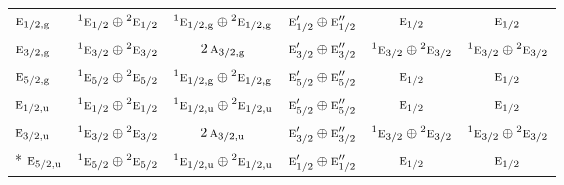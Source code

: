 \documentclass[10pt,a4paper]{article}
\numberwithin{equation}{section}
\newcommand{\irr}[1]{\text{\normalfont\scshape #1}}
\newcommand{\conjpair}[1]{{}^{#1}}
\newcommand{\ptag}[1]{\mathrm{#1}}
\begin{document}
{\begin{longtable}{@{}lccccc@{}}
$\irr{e}_{1/2,\ptag{g}}$ & $\conjpair{1}\irr{e}_{1/2}\oplus \conjpair{2}\irr{e}_{1/2}$ & $\conjpair{1}\irr{e}_{1/2,\ptag{g}}\oplus \conjpair{2}\irr{e}_{1/2,\ptag{g}}$ & $\irr{e}_{1/2}'\oplus \irr{e}_{1/2}''$ & $\irr{e}_{1/2}$ & $\irr{e}_{1/2}$\\
$\irr{e}_{3/2,\ptag{g}}$ & $\conjpair{1}\irr{e}_{3/2}\oplus \conjpair{2}\irr{e}_{3/2}$ & $2\,\irr{a}_{3/2,\ptag{g}}$ & $\irr{e}_{3/2}'\oplus \irr{e}_{3/2}''$ & $\conjpair{1}\irr{e}_{3/2}\oplus \conjpair{2}\irr{e}_{3/2}$ & $\conjpair{1}\irr{e}_{3/2}\oplus \conjpair{2}\irr{e}_{3/2}$\\
$\irr{e}_{5/2,\ptag{g}}$ & $\conjpair{1}\irr{e}_{5/2}\oplus \conjpair{2}\irr{e}_{5/2}$ & $\conjpair{1}\irr{e}_{1/2,\ptag{g}}\oplus \conjpair{2}\irr{e}_{1/2,\ptag{g}}$ & $\irr{e}_{5/2}'\oplus \irr{e}_{5/2}''$ & $\irr{e}_{1/2}$ & $\irr{e}_{1/2}$\\
$\irr{e}_{1/2,\ptag{u}}$ & $\conjpair{1}\irr{e}_{1/2}\oplus \conjpair{2}\irr{e}_{1/2}$ & $\conjpair{1}\irr{e}_{1/2,\ptag{u}}\oplus \conjpair{2}\irr{e}_{1/2,\ptag{u}}$ & $\irr{e}_{5/2}'\oplus \irr{e}_{5/2}''$ & $\irr{e}_{1/2}$ & $\irr{e}_{1/2}$\\
$\irr{e}_{3/2,\ptag{u}}$ & $\conjpair{1}\irr{e}_{3/2}\oplus \conjpair{2}\irr{e}_{3/2}$ & $2\,\irr{a}_{3/2,\ptag{u}}$ & $\irr{e}_{3/2}'\oplus \irr{e}_{3/2}''$ & $\conjpair{1}\irr{e}_{3/2}\oplus \conjpair{2}\irr{e}_{3/2}$ & $\conjpair{1}\irr{e}_{3/2}\oplus \conjpair{2}\irr{e}_{3/2}$\\*
$\irr{e}_{5/2,\ptag{u}}$ & $\conjpair{1}\irr{e}_{5/2}\oplus \conjpair{2}\irr{e}_{5/2}$ & $\conjpair{1}\irr{e}_{1/2,\ptag{u}}\oplus \conjpair{2}\irr{e}_{1/2,\ptag{u}}$ & $\irr{e}_{1/2}'\oplus \irr{e}_{1/2}''$ & $\irr{e}_{1/2}$ & $\irr{e}_{1/2}$\\
\bottomrule\end{longtable}}
\end{document}
